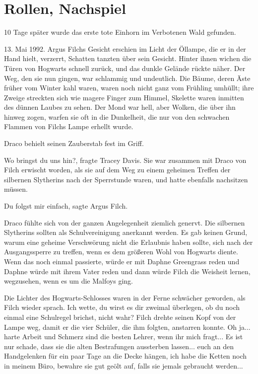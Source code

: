 \chapter{Rollen, Nachspiel}

10 Tage später wurde das erste tote Einhorn im Verbotenen Wald gefunden.

13. Mai 1992. Argus Filchs Gesicht erschien im Licht der Öllampe, die er in der
Hand hielt, verzerrt, Schatten tanzten über sein Gesicht. Hinter ihnen
wichen die Türen von Hogwarts schnell zurück, und das dunkle Gelände
rückte näher. Der Weg, den sie nun gingen, war schlammig und undeutlich.
Die Bäume, deren Äste früher vom Winter kahl waren, waren noch nicht ganz
vom Frühling umhüllt; ihre Zweige streckten sich wie magere Finger zum
Himmel, Skelette waren inmitten des dünnen Laubes zu sehen. Der Mond war
hell, aber Wolken, die über ihn hinweg zogen, warfen sie oft in die
Dunkelheit, die nur von den schwachen Flammen von Filchs Lampe erhellt
wurde.

Draco behielt seinen Zauberstab fest im Griff.

\glqq{}Wo bringst du uns hin?\grqq{}, fragte Tracey Davis. Sie war zusammen mit
Draco von Filch erwischt worden, als sie auf dem Weg zu einem geheimen
Treffen der silbernen Slytherins nach der Sperrstunde waren, und hatte
ebenfalls nachsitzen müssen.

\glqq{}Du folgst mir einfach\grqq{}, sagte Argus Filch.

Draco fühlte sich von der ganzen Angelegenheit ziemlich genervt. Die silbernen
Slytherins sollten als Schulvereinigung anerkannt werden. Es gab keinen
Grund, warum eine geheime Verschwörung nicht die Erlaubnis haben sollte,
sich nach der Ausgangssperre zu treffen, wenn es dem größeren Wohl von
Hogwarts diente. Wenn das noch einmal passierte, würde er mit Daphne
Greengrass reden und Daphne würde mit ihrem Vater reden und dann würde
Filch die Weisheit lernen, wegzusehen, wenn es um die Malfoys ging.

Die Lichter des Hogwarts-Schlosses waren in der Ferne schwächer geworden, als
Filch wieder sprach. \glqq{}Ich wette, du wirst es dir zweimal überlegen,
ob du noch einmal eine Schulregel brichst, nicht wahr?\grqq{} Filch
drehte seinen Kopf von der Lampe weg, damit er die vier Schüler, die ihm
folgten, anstarren konnte. \glqq{}Oh ja... harte Arbeit und Schmerz sind
die besten Lehrer, wenn ihr mich fragt... Es ist nur schade, dass sie die
alten Bestrafungen aussterben lassen... euch an den Handgelenken für ein
paar Tage an die Decke hängen, ich habe die Ketten noch in meinem Büro,
bewahre sie gut geölt auf, falls sie jemals gebraucht werden...\grqq{}

